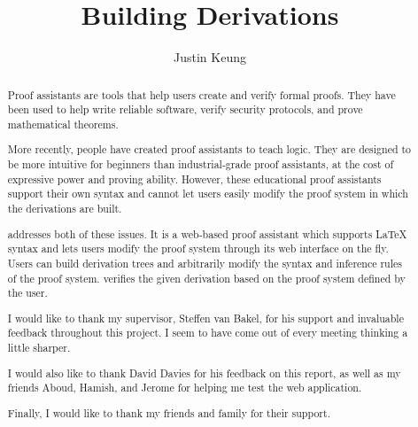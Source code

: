 \documentclass[a4paper, twoside, 11pt]{report}
\title{Building Derivations}
\author{Justin Keung}
\begin{document}


\begin{abstract}
Proof assistants are tools that help users create and verify formal proofs. They have been used to help write reliable software, verify security protocols, and prove mathematical theorems.

More recently, people have created proof assistants to teach logic. They are designed to be more intuitive for beginners than industrial-grade proof assistants, at the cost of expressive power and proving ability. However, these educational proof assistants  support their own syntax and cannot let users easily modify the proof system in which the derivations are built.

\projectname{} addresses both of these issues. It is a web-based proof assistant which supports \LaTeX{} syntax and lets users modify the proof system through its web interface on the fly. Users can build derivation trees and arbitrarily modify the syntax and inference rules of the proof system. \projectname{} verifies the given derivation based on the proof system defined by the user.

\end{abstract}

\renewcommand{\abstractname}{Acknowledgements}
\begin{abstract}
I would like to thank my supervisor, Steffen van Bakel, for his support and invaluable feedback throughout this project. I seem to have come out of every meeting thinking a little sharper.

I would also like to thank David Davies for his feedback on this report, as well as my friends Aboud, Hamish, and Jerome for helping me test the web application.

Finally, I would like to thank my friends and family for their support.
\end{abstract}

\pagestyle{toc}
\tableofcontents
\listoffigures

\pagestyle{fancy}








% 

\DeclareRobustCommand{\VAN}[3]{#3}
\printbibliography

\pagebreak

\end{document}
